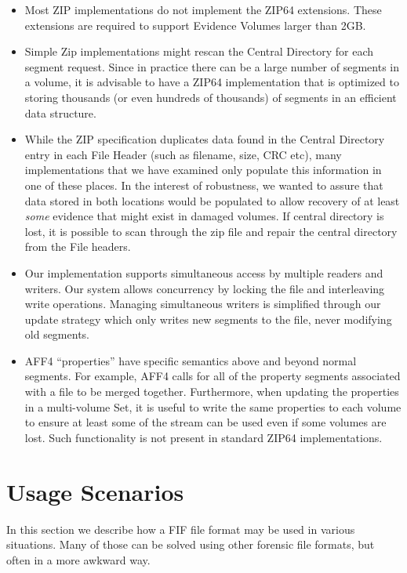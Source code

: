 \documentclass[10pt, conference]{IEEEtran}
\begin{document}
\begin{itemize}
\item Most ZIP implementations do not implement the ZIP64
  extensions. These extensions are required to support Evidence
  Volumes larger than 2GB.
\item Simple Zip implementations might rescan the
Central Directory for each segment request. Since in practice there
can be a large number of segments in a volume, it is advisable to have
a ZIP64 implementation that is optimized to storing thousands (or even
hundreds of thousands) of segments in an efficient data structure. 
\item While the ZIP specification duplicates data found in the Central
  Directory entry in each File Header (such as filename, size, CRC
  etc), many implementations that we have examined only populate this
  information in one of these places. In the interest of robustness,
  we wanted to assure that data stored in both locations would be
  populated to allow recovery of at least \emph{some} evidence that
  might exist in damaged volumes. If central directory is lost, it is
  possible to scan through the zip file and repair the central
  directory from the File headers.

\item Our implementation supports simultaneous access by multiple
  readers and writers. Our system allows concurrency by locking the
  file and interleaving write operations. Managing simultaneous
  writers is simplified through our update strategy which only writes
  new segments to the file, never modifying old segments. 
\item AFF4 ``properties'' have specific semantics above and beyond
  normal segments. For example, AFF4 calls for all of the property
  segments associated with a file to be merged together. Furthermore,
  when updating the properties in a multi-volume Set, it is useful to
  write the same properties to each volume to ensure at least some of
the stream can be used even if some volumes are lost. Such
functionality is not present in standard ZIP64 implementations.
\end{itemize}

\section{Usage Scenarios}
In this section we describe how a FIF file format may be used in
various situations. Many of those can be solved using other forensic
file formats, but often in a more awkward way.
\end{document}
